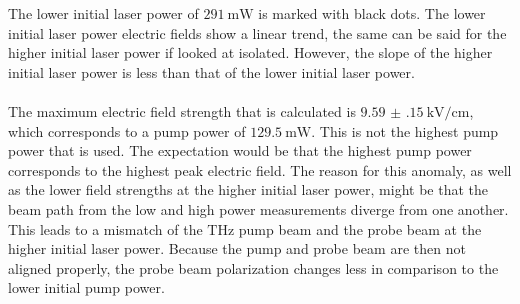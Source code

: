 The lower initial laser power of $\SI{291}{\milli\W}$ is marked with black dots.
The lower initial laser power electric fields show a linear trend, the same can be said for the higher initial laser power if looked at isolated.
However, the slope of the higher initial laser power is less than that of the lower initial laser power.
\\\\
The maximum electric field strength that is calculated is $\SI{9.59(15)}{\kilo\V\per\centi\meter}$, which corresponds to a pump power of $\SI{129.5}{\milli\W}$.
This is not the highest pump power that is used.
The expectation would be that the highest pump power corresponds to the highest peak electric field.
The reason for this anomaly, as well as the lower field strengths at the higher initial laser power, might be that the beam path from the low and high power measurements diverge from one another.
This leads to a mismatch of the $\si{\tera\hertz}$ pump beam and the probe beam at the higher initial laser power.
Because the pump and probe beam are then not aligned properly, the probe beam polarization changes less in comparison to the lower initial pump power.

\FloatBarrier
